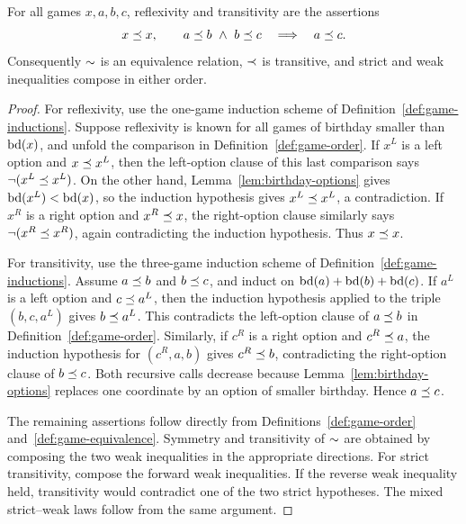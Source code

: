 \begin{theorem}
  \label{thm:game-order-calculus}
  \leanok
  For all games \(x,a,b,c\), reflexivity and transitivity are the assertions
  \[
    x\preceq x,
    \qquad
    a\preceq b\ \wedge\ b\preceq c
      \quad\Longrightarrow\quad a\preceq c.
  \]
  Consequently \(\sim\) is an equivalence relation, \(\prec\) is transitive, and strict
  and weak inequalities compose in either order.
\end{theorem}
\begin{proof}
  \leanok
  For reflexivity, use the one-game induction scheme of
  Definition~\ref{def:game-inductions}.  Suppose reflexivity is known for all
  games of birthday smaller than \(\operatorname{bd}(x)\), and unfold the comparison in
  Definition~\ref{def:game-order}.  If \(x^L\) is a left option and
  \(x\preceq x^L\), then the left-option clause of this last comparison says
  \(\neg(x^L\preceq x^L)\).  On the other hand,
  Lemma~\ref{lem:birthday-options} gives \(\operatorname{bd}(x^L)<\operatorname{bd}(x)\), so the induction
  hypothesis gives \(x^L\preceq x^L\), a contradiction.  If \(x^R\) is a
  right option and \(x^R\preceq x\), the right-option clause similarly says
  \(\neg(x^R\preceq x^R)\), again contradicting the induction hypothesis.
  Thus \(x\preceq x\).

  For transitivity, use the three-game induction scheme of
  Definition~\ref{def:game-inductions}.  Assume \(a\preceq b\) and
  \(b\preceq c\), and induct on
  \(\operatorname{bd}(a)+\operatorname{bd}(b)+\operatorname{bd}(c)\).  If \(a^L\) is a left option and
  \(c\preceq a^L\), then the induction hypothesis applied to the triple
  \((b,c,a^L)\) gives \(b\preceq a^L\).  This contradicts the left-option
  clause of \(a\preceq b\) in Definition~\ref{def:game-order}.  Similarly, if
  \(c^R\) is a right option and \(c^R\preceq a\), the induction hypothesis for
  \((c^R,a,b)\) gives \(c^R\preceq b\), contradicting the right-option clause
  of \(b\preceq c\).  Both recursive calls decrease because
  Lemma~\ref{lem:birthday-options} replaces one coordinate by an option of
  smaller birthday.  Hence \(a\preceq c\).

  The remaining assertions follow directly from
  Definitions~\ref{def:game-order} and~\ref{def:game-equivalence}.  Symmetry and transitivity
  of \(\sim\)
  are obtained by composing the two weak inequalities in the appropriate
  directions.  For strict transitivity, compose the forward weak inequalities.
  If the reverse weak inequality held, transitivity would contradict one of
  the two strict hypotheses.  The mixed strict--weak laws follow from the same
  argument.
\end{proof}

